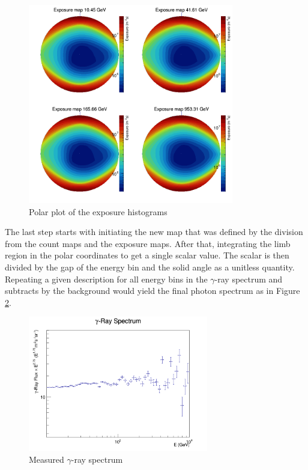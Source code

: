 \begin{figure}[h!]
    \centering
    \includegraphics[width=0.8\textwidth]{content/result_and_discussion/figures/polar_expmaps.png}
    \caption{Polar plot of the exposure histograms}
    \label{fig:expmap_polar}
\end{figure}


The last step starts with initiating the new map that was 
defined by the division from the count maps and the exposure maps.
After that, integrating the limb region in the polar coordinates
to get a single scalar value. The scalar is then divided by the 
gap of the energy bin and the solid angle as a unitless quantity.
Repeating a given description for all energy bins in the $\gamma$-ray 
spectrum and subtracts by the background would yield the final 
photon spectrum as in Figure \ref{fig:flxhist}.

\begin{figure}[h!]
    \centering
    \includegraphics[width=0.7\textwidth]{content/result_and_discussion/figures/flx_hist.png}
    \caption{Measured $\gamma$-ray spectrum}
    \label{fig:flxhist}
\end{figure}

